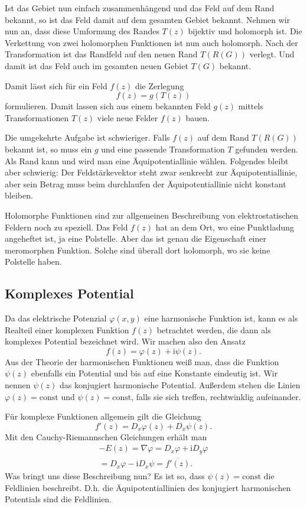 \documentclass[a4paper,11pt,fleqn,twocolumn,twoside,dvipdfmx]{scrartcl}
\newcommand{\ui}{\mathrm i}
\begin{document}
Ist das Gebiet nun einfach zusammenhängend und das Feld auf dem
Rand bekannt, so ist das Feld damit auf dem gesamten Gebiet bekannt.
Nehmen wir nun an, dass diese Umformung des Randes $T(z)$ bijektiv
und holomorph ist. Die Verkettung von zwei
holomorphen Funktionen ist nun auch holomorph. Nach der
Transformation ist das Randfeld auf den neuen Rand
$T(R(G))$ verlegt. Und damit ist das Feld auch im gesamten neuen
Gebiet $T(G)$ bekannt.

Damit lässt sich für ein Feld $f(z)$ die Zerlegung
\[f(z) = g(T(z))\]
formulieren. Damit lassen sich aus einem bekannten Feld $g(z)$
mittels Transformationen $T(z)$ viele neue Felder $f(z)$ bauen.

Die umgekehrte Aufgabe ist schwieriger. Falls $f(z)$ auf dem
Rand $T(R(G))$ bekannt ist, so muss ein $g$ und eine passende
Transformation $T$ gefunden werden. Als Rand kann und wird man eine
Äquipotentiallinie wählen. Folgendes bleibt aber schwierig: Der
Feldstärkevektor steht zwar senkrecht zur Äquipotentiallinie,
aber sein Betrag muss beim durchlaufen der Äquipotentiallinie
nicht konstant bleiben.

Holomorphe Funktionen sind zur allgemeinen Beschreibung von
elektrostatischen Feldern noch zu speziell. Das Feld $f(z)$ hat
an dem Ort, wo eine Punktladung angeheftet ist, ja eine Polstelle.
Aber das ist genau die Eigenschaft einer meromorphen Funktion. Solche
sind überall dort holomorph, wo sie keine Polstelle haben.


\subsection{Komplexes Potential}

Da das elektrische Potenzial $\varphi(x,y)$ eine harmonische
Funktion ist, kann es als Realteil einer komplexen Funktion $f(z)$
betrachtet werden, die dann als komplexes Potential bezeichnet wird.
Wir machen also den Ansatz
\[f(z) = \varphi(z)+\ui\psi(z).\]
Aus der Theorie der harmonischen Funktionen weiß man, dass die
Funktion $\psi(z)$ ebenfalls ein Potential und bis auf eine
Konstante eindeutig ist. Wir nennen $\psi(z)$ das konjugiert
harmonische Potential. Außerdem stehen die Linien $\varphi(z)=\mathrm{const}$
und $\psi(z)=\mathrm{const}$, falls sie sich treffen,
rechtwinklig aufeinander.

Für komplexe Funktionen allgemein gilt die Gleichung
\[f'(z) = D_x\varphi(z)+D_x\psi(z).\]
Mit den Cauchy-Riemannschen Gleichungen erhält man
\begin{gather*}
-E(z) = \nabla\varphi = D_x\varphi+\ui D_y\varphi\\
= D_x\varphi-\ui D_x\psi = \overline{f'(z)}.
\end{gather*}
Was bringt uns diese Beschreibung nun? Es ist so, dass
$\psi(z)=\mathrm{const}$ die Feldlinien beschreibt. D.h. die
Äquipotentiallinien des konjugiert harmonischen Potentials sind
die Feldlinien.
\end{document}
